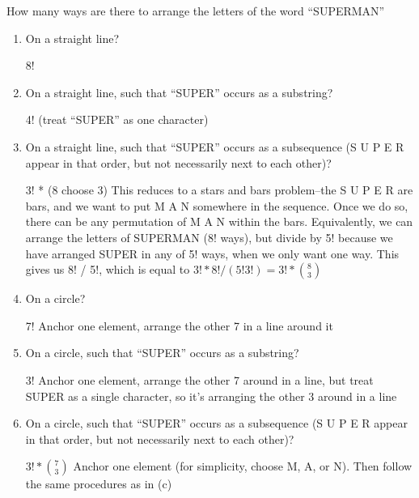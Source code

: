 \question How many ways are there to arrange the letters of the word 
“SUPERMAN”
\begin{enumerate}[label=(\alph*)]
 \item On a straight line?
\begin{solution} 8! \end{solution}

\item On a straight line, such that “SUPER” occurs as a substring?
\begin{solution} 4! (treat “SUPER” as one character) \end{solution}

\item On a straight line, such that “SUPER” occurs as a subsequence 
(S U P E R appear in that order, but not necessarily next to each other)? 
\begin{solution} 3! * (8 choose 3)
This reduces to a stars and bars problem--the S U P E R are bars, and 
we want to put M A N somewhere in the sequence. Once we do so, there 
can be any permutation of M A N within the bars.
Equivalently, we can arrange the letters of SUPERMAN (8! ways), but 
divide by 5! because we have arranged SUPER in any of 5! ways, when 
we only want one way. This gives us 8! / 5!, which is equal to 
$3! * 8! / (5! 3!) = 3! * {8 \choose 3}$
 \end{solution}


\item On a circle? 
\begin{solution} 7!
    Anchor one element, arrange the other 7 in a line around it
 \end{solution}


\item On a circle, such that “SUPER” occurs as a substring?
\begin{solution} 3!
Anchor one element, arrange the other 7 around in a line, but treat 
SUPER as a single character, so it’s arranging the other 3 around in 
a line  \end{solution}

\item On a circle, such that “SUPER” occurs as a subsequence (S U P E R 
appear in that order, but not necessarily next to each other)?
\begin{solution} $3! * {7 \choose 3}$
Anchor one element (for simplicity, choose M, A, or N). Then follow the same procedures as in (c) \end{solution}

\end{enumerate}